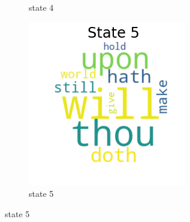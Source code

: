 \begin{figure}[H]
\begin{subfigure}[t]{0.3\textwidth}
		\caption{state 4}
	\end{subfigure}%
	\begin{subfigure}[t]{0.3\textwidth}
		\includegraphics[width=\textwidth]{download(5).png}
		\caption{state 5}
	\end{subfigure}%
	
	\bigskip 
	

\end{figure}
